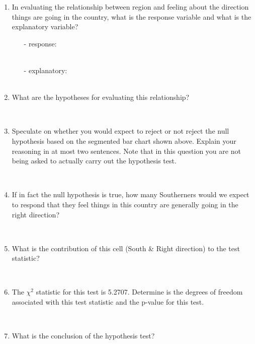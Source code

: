 \documentclass[11pt]{article}
\newcommand{\soln}[2]{$\:$\\ \vspace{#1}}{}
\begin{document}
\begin{enumerate}

\item In evaluating the relationship between region and feeling about the direction things 
are going in the country, what is the response variable and what is the explanatory variable?
\begin{itemize}
\item[-] response: \soln{0.2cm}{direction} \\
\item[-] explanatory: \soln{0.2cm}{region} \\
\end{itemize}

\item What are the hypotheses for evaluating this relationship?

\soln{3cm}{$H_0:$ Region and opinion on direction are independent. \\
$H_A:$ Region and opinion on direction are dependent. \\
}

\item Speculate on whether you would expect to reject or not reject the null hypothesis based on the 
segmented bar chart shown above. Explain your reasoning in at most two sentences. Note that in
this question you are not being asked to actually carry out the hypothesis test.

\soln{3cm}{No, \\
P(right direction $|$ each level of the region variable) is roughly equal, chances are we won't reject $H_0$.}

\item If in fact the null hypothesis is true, how many Southerners would we expect to respond that 
they feel things in this country are generally going in the right direction?

\soln{3cm}{$E = \frac{193 \times 171}{500} = 66.006$}

\item What is the contribution of this cell (South \& Right direction) to the test statistic?

\soln{3cm}{$\frac{(62 - 66.006)^2}{66.006} = 0.24313$}

\item The $\chi^2$ statistic for this test is 5.2707. Determine is the degrees of freedom associated with this
test statistic and the p-value for this test.

\soln{3cm}{$df = (R - 1) \times (C - 1) = 3 \times 1 = 3$ \\
$p-value = 0.153$ (or something around this if using the table)
}

\item What is the conclusion of the hypothesis test?

\soln{1cm}{Fail to reject $H_0$. The data do not provide convincing evidence for a relationship
between region and feeling about the direction things are going in the country.
}

\end{enumerate}
\end{document}
